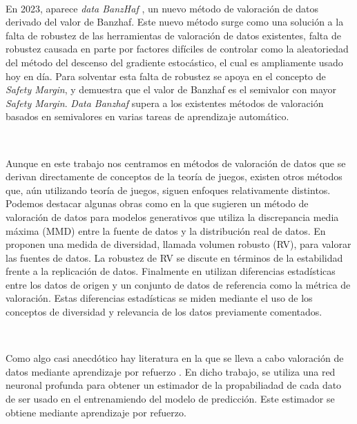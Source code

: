 \

En 2023, aparece \textit{data BanzHaf} \cite{dataBanzhaf},
un nuevo método de valoración de datos derivado del valor de Banzhaf.
Este nuevo método surge como una solución a la falta de robustez
de las herramientas de valoración de datos existentes, falta de
robustez causada en parte por factores difíciles de controlar como
la aleatoriedad del método del descenso del gradiente
estocástico, el cual es ampliamente usado hoy en día.
Para solventar esta falta de robustez se apoya en el
concepto de \textit{Safety Margin}, y demuestra que el valor de
Banzhaf es el semivalor con mayor \textit{Safety Margin}. 
\textit{Data Banzhaf} supera a los existentes métodos de valoración
basados en semivalores en varias tareas de aprendizaje automático.

\

Aunque en este trabajo nos centramos en
métodos de valoración de datos que se derivan directamente de
conceptos de la teoría de juegos, existen otros métodos
que, aún utilizando teoría de juegos, siguen enfoques relativamente
distintos. Podemos destacar algunas obras como \cite{tay} en la que
sugieren un método de valoración de datos para modelos
generativos que utiliza la discrepancia media máxima (MMD) entre
la fuente de datos y la distribución real de datos. En \cite{xu}
proponen una medida de diversidad, llamada volumen robusto (RV),
para valorar las fuentes de datos. La robustez de RV se discute
en términos de la estabilidad frente a la replicación de datos.
Finalmente en \cite{amiri} utilizan diferencias estadísticas
entre los datos de origen y un conjunto de datos de referencia
como la métrica de valoración. Estas diferencias estadísticas
se miden mediante el uso de los conceptos de diversidad y
relevancia de los datos previamente comentados.

\

Como algo casi anecdótico hay literatura en la que se lleva a
cabo valoración de datos mediante aprendizaje por refuerzo
\cite{reinforcement}. En dicho trabajo, se utiliza una red
neuronal profunda para obtener un estimador de la propabiliadad
de cada dato de ser usado en el entrenamiendo del modelo
de predicción. Este estimador se obtiene mediante aprendizaje
por refuerzo.